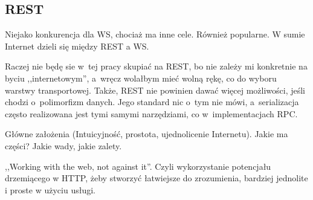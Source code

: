 %
%

\subsection{REST}
Niejako konkurencja dla WS, chociaż ma inne cele. Również popularne. W sumie Internet dzieli się między REST a WS.

Raczej nie będę sie w~tej pracy skupiać na REST, bo nie zależy mi konkretnie na byciu ,,internetowym'', a~wręcz wolałbym mieć wolną rękę, co do wyboru warstwy transportowej. Także, REST nie powinien dawać więcej możliwości, jeśli chodzi o~polimorfizm danych. Jego standard nic o~tym nie mówi, a~serializacja często realizowana jest tymi samymi narzędziami, co w~implementacjach RPC.

Główne założenia (Intuicyjność, prostota, ujednolicenie Internetu). Jakie ma części? Jakie wady, jakie zalety.

,,Working with the web, not against it''. Czyli wykorzystanie potencjału drzemiącego w HTTP, żeby stworzyć łatwiejsze do zrozumienia, bardziej jednolite i proste w użyciu usługi.

%
%
%
%
